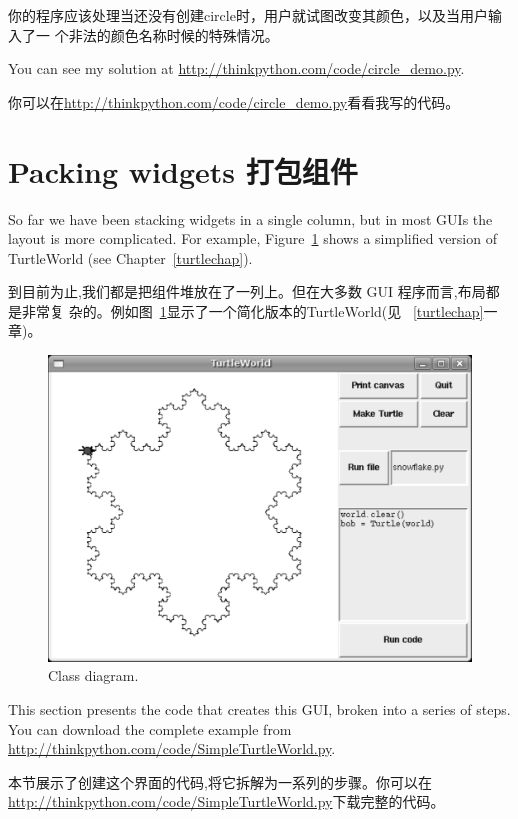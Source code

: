 \documentclass[10pt]{book}
\begin{document}
\begin{CJK}{UTF8}{gbsn}
\begin{exercise}
你的程序应该处理当还没有创建circle时，用户就试图改变其颜色，以及当用户输入了一
个非法的颜色名称时候的特殊情况。

You can see my solution at \url{http://thinkpython.com/code/circle_demo.py}.

你可以在\url{http://thinkpython.com/code/circle_demo.py}看看我写的代码。


\end{exercise}


\section{Packing widgets 打包组件}

So far we have been stacking widgets in a single column, but in most
GUIs the layout is more complicated.  For example,
Figure~\ref{fig.turtleworld} shows a simplified version of
TurtleWorld (see Chapter~\ref{turtlechap}).

到目前为止,我们都是把组件堆放在了一列上。但在大多数 GUI 程序而言,布局都是非常复
杂的。例如图~\ref{fig.turtleworld}显示了一个简化版本的TurtleWorld(见
~\ref{turtlechap}一章)。

\begin{figure}
\centerline{\includegraphics[scale=0.5]{figs/TurtleWorld.pdf}}
\caption{Class diagram.}
\label{fig.turtleworld}
\end{figure}


This section presents the code that creates this GUI, broken into a
series of steps.  You can download the complete example
from \url{http://thinkpython.com/code/SimpleTurtleWorld.py}.

本节展示了创建这个界面的代码,将它拆解为一系列的步骤。你可以在
\url{http://thinkpython.com/code/SimpleTurtleWorld.py}下载完整的代码。


\end{CJK}
\end{document}
